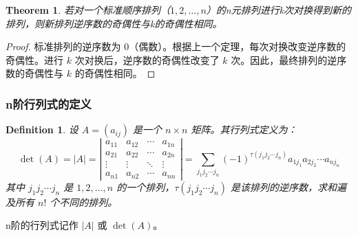 \documentclass[10pt, a4paper, oneside, UTF8]{ctexbook}
\newtheorem{theorem}{Theorem}[section]
\newtheorem{definition}{Definition}[section]
\begin{document}
\begin{theorem}
  若对一个标准顺序排列（$1, 2, \dots, n$）的n元排列进行k次对换得到新的排列，则新排列逆序数的奇偶性与k的奇偶性相同。
\end{theorem}
\begin{proof}
  标准排列的逆序数为 0（偶数）。根据上一个定理，每次对换改变逆序数的奇偶性。进行 $k$ 次对换后，逆序数的奇偶性改变了 $k$
  次。因此，最终排列的逆序数的奇偶性与 $k$ 的奇偶性相同。
\end{proof}

\subsubsection*{n阶行列式的定义}

\begin{definition}
  设 $A = (a_{ij})$ 是一个 $n \times n$ 矩阵。其行列式定义为：
  \[
    \det(A) = |A| = \left|
    \begin{matrix}
      a_{11} & a_{12} & \cdots & a_{1n} \\
      a_{21} & a_{22} & \cdots & a_{2n} \\
      \vdots & \vdots & \ddots & \vdots \\
      a_{n1} & a_{n2} & \cdots & a_{nn}
    \end{matrix}\right| = \sum_{j_1j_2 \cdots j_n} (-1)^{\tau(j_1j_2
    \cdots j_n)} a_{1j_1}a_{2j_2}\cdots a_{nj_n}
  \]
  其中 $j_1j_2 \cdots j_n$ 是 $1, 2, \dots, n$ 的一个排列，$\tau(j_1j_2 \cdots
  j_n)$ 是该排列的逆序数，求和遍及所有 $n!$ 个不同的排列。
\end{definition}

n阶的行列式记作 $|A|$ 或 $\det(A)$。
\end{document}
